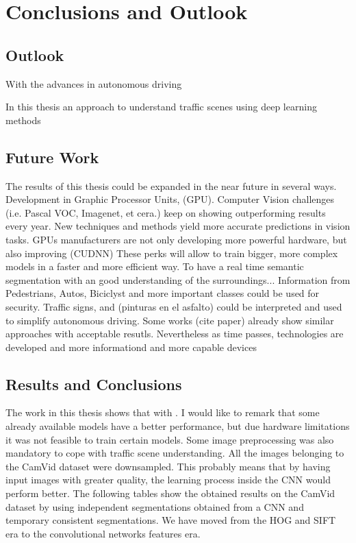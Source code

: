 \chapter{Conclusions and Outlook}
\label{ch:concl}
\section{Outlook}
\label{Outlook}
With the advances in autonomous driving 

In this thesis an approach to understand traffic scenes using deep learning methods

\section{Future Work}
\label{Future Work}
The results of this thesis could be expanded in the near future in several ways. Development in Graphic Processor Units, (GPU). Computer Vision challenges (i.e. Pascal VOC, Imagenet, et cera.) keep on showing outperforming results every year. New techniques and methods yield more accurate predictions in vision tasks. GPUs manufacturers are not only developing more powerful hardware, but also improving (CUDNN) These perks will allow to train bigger, more complex models in a faster and more efficient way.  To have a real time semantic segmentation with an good understanding of the surroundings... Information from Pedestrians, Autos, Biciclyst and more important classes could be used for security. Traffic signs, and (pinturas en el asfalto) could be interpreted and used to simplify autonomous driving. Some works (cite paper) already show similar approaches with acceptable resutls. Nevertheless as time passes, technologies are developed and more informationd and more capable devices   
\section{Results and Conclusions}
\label{Results and Conclusions}
The work in this thesis shows that with .
I would like to remark that some already available models have a better performance, but due hardware limitations it was not feasible to train certain models. Some image preprocessing was also mandatory to cope with traffic scene understanding. All the images belonging to the CamVid dataset were downsampled. This probably means that by having input images with greater quality, the learning process inside the CNN would perform better. The following tables show the obtained results on the CamVid dataset by using independent segmentations obtained from a CNN and temporary consistent segmentations. 
We have moved from the HOG and SIFT era to the convolutional networks features era. 